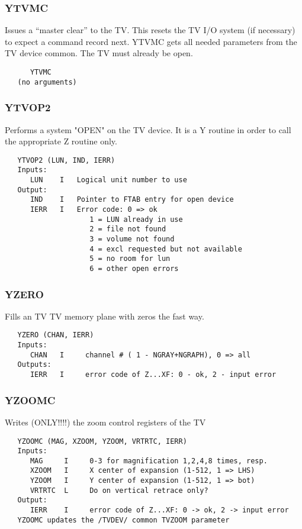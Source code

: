 \subsubsection{YTVMC}
Issues a ``master clear'' to the TV.  This resets the TV I/O system (if
necessary) to expect a command record next. YTVMC gets all needed
parameters from the TV device common. The TV must already be open.

\begin{verbatim}
      YTVMC
   (no arguments)
\end{verbatim}

\subsubsection{YTVOP2}
Performs a system "OPEN" on the TV device.  It is a Y
routine in order to call the appropriate Z routine only.
\begin{verbatim}
   YTVOP2 (LUN, IND, IERR)
   Inputs:
      LUN    I   Logical unit number to use
   Output:
      IND    I   Pointer to FTAB entry for open device
      IERR   I   Error code: 0 => ok
                    1 = LUN already in use
                    2 = file not found
                    3 = volume not found
                    4 = excl requested but not available
                    5 = no room for lun
                    6 = other open errors

\end{verbatim}

\subsubsection{YZERO}
Fills an TV TV memory plane with zeros the fast way.
\begin{verbatim}
   YZERO (CHAN, IERR)
   Inputs:
      CHAN   I     channel # ( 1 - NGRAY+NGRAPH), 0 => all
   Outputs:
      IERR   I     error code of Z...XF: 0 - ok, 2 - input error

\end{verbatim}

\subsubsection{YZOOMC}
Writes (ONLY!!!!) the zoom control registers of the TV
\begin{verbatim}
   YZOOMC (MAG, XZOOM, YZOOM, VRTRTC, IERR)
   Inputs:
      MAG     I     0-3 for magnification 1,2,4,8 times, resp.
      XZOOM   I     X center of expansion (1-512, 1 => LHS)
      YZOOM   I     Y center of expansion (1-512, 1 => bot)
      VRTRTC  L     Do on vertical retrace only?
   Output:
      IERR    I     error code of Z...XF: 0 -> ok, 2 -> input error
   YZOOMC updates the /TVDEV/ common TVZOOM parameter

\end{verbatim}



